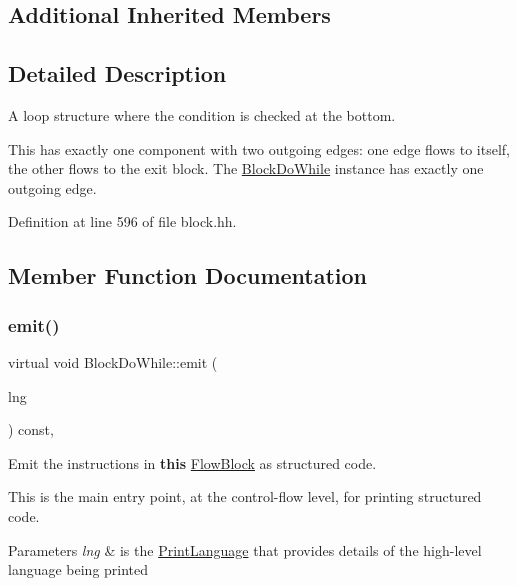 \subsection*{Additional Inherited Members}


\subsection{Detailed Description}
A loop structure where the condition is checked at the bottom. 

This has exactly one component with two outgoing edges\+: one edge flows to itself, the other flows to the exit block. The \mbox{\hyperlink{class_block_do_while}{Block\+Do\+While}} instance has exactly one outgoing edge. 

Definition at line 596 of file block.\+hh.



\subsection{Member Function Documentation}
\mbox{\label{class_block_do_while_aa3ab4da82b72f8de35ad9de5f5dff9a2}} 
\subsubsection{\texorpdfstring{emit()}{emit()}}
{\footnotesize\ttfamily virtual void Block\+Do\+While\+::emit (\begin{DoxyParamCaption}\item[{\mbox{\hyperlink{class_print_language}{Print\+Language}} $\ast$}]{lng }\end{DoxyParamCaption}) const\hspace{0.3cm}{\ttfamily [inline]}, {\ttfamily [virtual]}}



Emit the instructions in {\bfseries{this}} \mbox{\hyperlink{class_flow_block}{Flow\+Block}} as structured code. 

This is the main entry point, at the control-\/flow level, for printing structured code. 
\begin{DoxyParams}{Parameters}
{\em lng} & is the \mbox{\hyperlink{class_print_language}{Print\+Language}} that provides details of the high-\/level language being printed \\
\hline
\end{DoxyParams}



